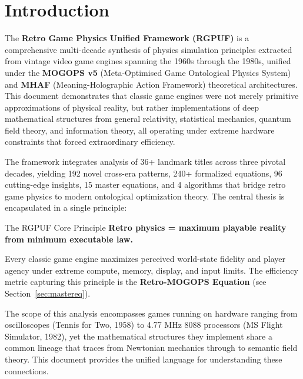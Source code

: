 \documentclass[11pt,a4paper]{article}
\theoremstyle{definition}
\begin{document}

\tableofcontents
\newpage

\section{Introduction}\label{sec:intro}

The \textbf{Retro Game Physics Unified Framework (RGPUF)} is a comprehensive multi-decade synthesis of physics simulation principles extracted from vintage video game engines spanning the 1960s through the 1980s, unified under the \textbf{MOGOPS v5} (Meta-Optimised Game Ontological Physics System) and \textbf{MHAF} (Meaning-Holographic Action Framework) theoretical architectures. This document demonstrates that classic game engines were not merely primitive approximations of physical reality, but rather implementations of deep mathematical structures from general relativity, statistical mechanics, quantum field theory, and information theory, all operating under extreme hardware constraints that forced extraordinary efficiency.

The framework integrates analysis of 36+ landmark titles across three pivotal decades, yielding 192 novel cross-era patterns, 240+ formalized equations, 96 cutting-edge insights, 15 master equations, and 4 algorithms that bridge retro game physics to modern ontological optimization theory. The central thesis is encapsulated in a single principle:

\begin{keybox}{The RGPUF Core Principle}
\textbf{Retro physics = maximum playable reality from minimum executable law.}

Every classic game engine maximizes perceived world-state fidelity and player agency under extreme compute, memory, display, and input limits. The efficiency metric capturing this principle is the \textbf{Retro-MOGOPS Equation} (see Section~\ref{sec:mastereq}).
\end{keybox}

The scope of this analysis encompasses games running on hardware ranging from oscilloscopes (Tennis for Two, 1958) to 4.77 MHz 8088 processors (MS Flight Simulator, 1982), yet the mathematical structures they implement share a common lineage that traces from Newtonian mechanics through to semantic field theory. This document provides the unified language for understanding these connections.
\end{document}

